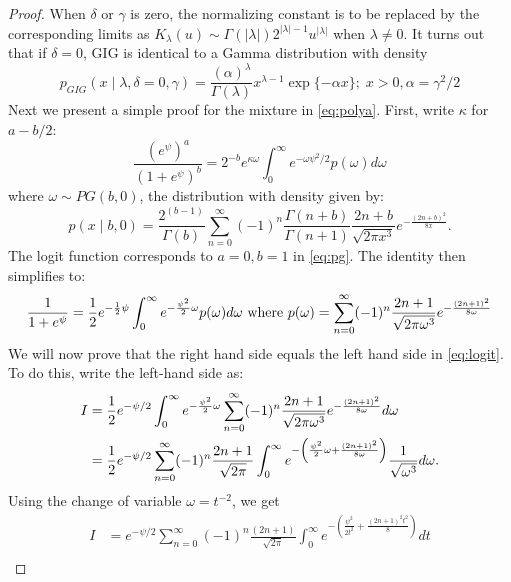 \documentclass[letterpaper,11pt]{article}
\begin{document}
\begin{proof}
When $\delta$ or $\gamma$ is zero, the normalizing constant is to be replaced by the corresponding limits as $K_{\lambda}(u) \sim \Gamma(|\lambda|)2^{|\lambda|-1} u^{|\lambda|}$ when $\lambda \neq 0$. It turns out that if $\delta=0$, GIG is identical to a Gamma distribution with density 
$$
p_{GIG}(x \mid \lambda, \delta = 0 , \gamma) = \frac{(\alpha)^{\lambda}}{\Gamma(\lambda)} x^{\lambda-1} \exp\{ -\alpha x \}; \; x > 0, \alpha = \gamma^2 / 2 
$$
%
Next we present a simple proof for the \PG mixture in \eqref{eq:polya}. First, write $\kappa$ for $a-b/2$: 
\begin{equation}
  \frac{(e^{\psi})^a}{(1+e^{\psi})^b} = 2^{-b} e^{\kappa \omega} \int_0^{\infty} e^{-\omega \psi^2/2} p(\omega) d\omega \label{eq:pg}
\end{equation}
where $\omega \sim PG(b,0)$, the \PG distribution with density given by: 
$$
p(x \mid b, 0) = \frac{2^{(b-1)}}{\Gamma(b)} \sum_{n=0}^{\infty} (-1)^n \frac{\Gamma(n+b)}{\Gamma(n+1)} \frac{2n+b}{\sqrt{2\pi x^3}} e^{-\frac{(2n+b)^2}{8x}}.
$$
The logit function corresponds to $a=0,b=1$ in \eqref{eq:pg}. The \CS identity then simplifies to:  
\begin{equation}
  \frac{1}{1+e^{\psi}} = \frac{1}{2} e^{-\frac{1}{2} \psi} \int_0^{\infty} e^{-\frac{\psi^2}{2} \omega} p(\omega) d\omega 
  \text{ where } p(\omega) = \sum_{n=0}^{\infty} (-1)^n \frac{2n+1}{\sqrt{2\pi \omega^3}} e^{-\frac{(2n+1)^2}{8\omega}}
  \label{eq:logit}
\end{equation}
We will now prove that the right hand side equals the left hand side in \eqref{eq:logit}. To do this, write the left-hand side as:
\begin{align*}
I & = \frac{1}{2} e^{-\psi/2} \int_0^{\infty} e^{-\frac{\psi^2}{2} \omega} \sum_{n=0}^{\infty} (-1)^n \frac{2n+1}{\sqrt{2\pi \omega^3}} e^{-\frac{(2n+1)^2}{8\omega}}d \omega \\
& = \frac{1}{2} e^{-\psi/2}  \sum_{n=0}^{\infty} (-1)^n \frac{2n+1}{\sqrt{2\pi}} \int_0^{\infty} e^{- \left( \frac{\psi^2}{2}  \omega + \frac{(2n+1)^2}{8\omega} \right) } \frac{1}{\sqrt{ \omega^3}} d\omega. 
\end{align*}
Using the change of variable $\omega = t^{-2}$, we get 
\begin{align*}
I & = e^{-\psi/2}  \sum_{n=0}^{\infty} (-1)^n \frac{(2n+1)}{\sqrt{2\pi}} \int_{0}^{\infty} e^{-\left( \frac{\psi^2}{2t^2} + \frac{(2n+1)^2 t^2}{8} \right)} d t \\

\end{align*}
\end{proof}
\end{document}
